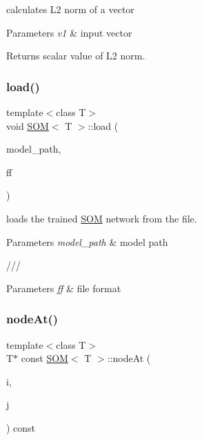 calculates L2 norm of a vector 


\begin{DoxyParams}{Parameters}
{\em v1} & input vector\\
\hline
\end{DoxyParams}
\begin{DoxyReturn}{Returns}
scalar value of L2 norm.
\end{DoxyReturn}
\mbox{\label{class_s_o_m_a81e6d3a9b190872b8b8fd5bac513cf20}} 
\subsubsection{\texorpdfstring{load()}{load()}}
{\footnotesize\ttfamily template$<$class T$>$ \\
void \mbox{\hyperlink{class_s_o_m}{S\+OM}}$<$ T $>$\+::load (\begin{DoxyParamCaption}\item[{const std\+::string \&}]{model\+\_\+path,  }\item[{const \mbox{\hyperlink{_s_o_m_8h_a78e44725402091318ad38c42d5c34e69}{S\+O\+M\+File\+Format}} \&}]{ff }\end{DoxyParamCaption})\hspace{0.3cm}{\ttfamily [inline]}}



loads the trained \mbox{\hyperlink{class_s_o_m}{S\+OM}} network from the file. 


\begin{DoxyParams}{Parameters}
{\em model\+\_\+path} & model path\\
\hline
\end{DoxyParams}
/// 
\begin{DoxyParams}{Parameters}
{\em ff} & file format\\
\hline
\end{DoxyParams}
\mbox{\label{class_s_o_m_a2d601f7afacfc9f7bd97d8725dd75f55}} 
\subsubsection{\texorpdfstring{node\+At()}{nodeAt()}}
{\footnotesize\ttfamily template$<$class T$>$ \\
T$\ast$ const \mbox{\hyperlink{class_s_o_m}{S\+OM}}$<$ T $>$\+::node\+At (\begin{DoxyParamCaption}\item[{int}]{i,  }\item[{int}]{j }\end{DoxyParamCaption}) const\hspace{0.3cm}{\ttfamily [inline]}}



